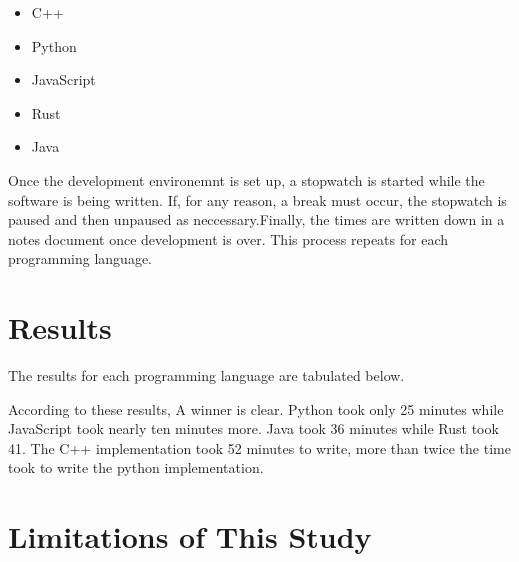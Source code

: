 \documentclass{article}
\begin{document}
\begin{itemize}
        \item C++
        \item Python
        \item JavaScript
        \item Rust
        \item Java
\end{itemize}

Once the development environemnt is set up, a stopwatch is started while the software is being written. If, for any reason, a break must occur, the stopwatch is paused and then unpaused as neccessary.Finally, the times are written down in a notes document once development is over. This process repeats for each programming language. 

\section{Results}

The results for each programming language are tabulated below.
\begin{center}
\begin{adjustbox}{center}
\end{adjustbox}
\end{center}

According to these results, A winner is clear. Python took only 25 minutes while JavaScript took nearly ten minutes more. Java took 36 minutes while Rust took 41. The C++ implementation took 52 minutes to write, more than twice the time took to write the python implementation.

\section{Limitations of This Study}
\end{document}
